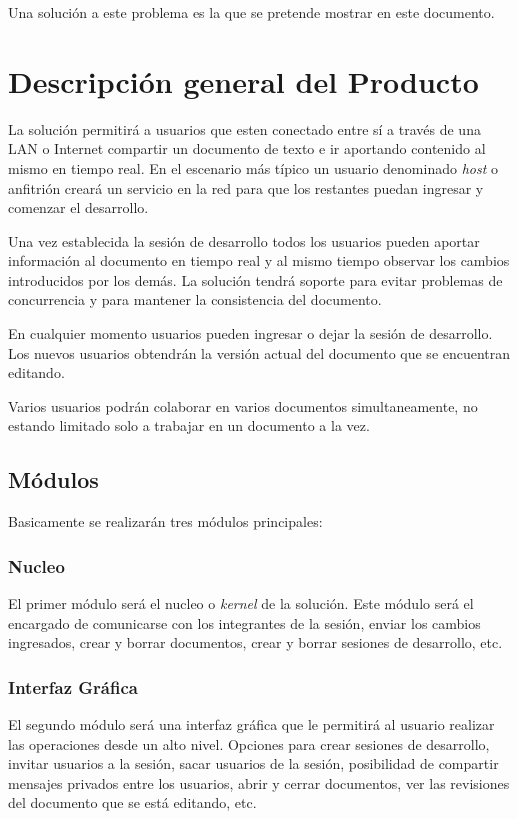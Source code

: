 \documentclass[a4paper,11pt]{article}
\begin{document}
		    Una soluci\'on a este problema es la que se pretende mostrar en este documento.

	\section{Descripci\'on general del Producto}
		La soluci\'on permitir\'a a usuarios que esten conectado entre s\'i a trav\'es de
		una LAN o Internet compartir un documento de texto e ir aportando contenido al mismo en
		tiempo real. En el escenario m\'as t\'ipico un usuario denominado \textit{host} o
		anfitri\'on crear\'a un servicio en la red para que los restantes puedan ingresar y
		comenzar el desarrollo.

		Una vez establecida la sesi\'on de desarrollo todos los usuarios pueden aportar
		informaci\'on al documento en tiempo real y al mismo tiempo observar los cambios
		introducidos por los dem\'as. La soluci\'on tendr\'a soporte para evitar problemas de
		concurrencia y para mantener la consistencia del documento.

	    En cualquier momento usuarios pueden ingresar o dejar la sesi\'on de desarrollo. Los
	    nuevos usuarios obtendr\'an la versi\'on actual del documento que se encuentran editando.

	    Varios usuarios podr\'an colaborar en varios documentos simultaneamente, no estando
	    limitado solo a trabajar en un documento a la vez.

		\subsection{M\'odulos}
			Basicamente se realizar\'an tres m\'odulos principales:

				\subsubsection{Nucleo}
					El primer m\'odulo ser\'a el nucleo o \textit{kernel} de la soluci\'on.
					Este m\'odulo ser\'a el encargado de comunicarse con los integrantes de
					la sesi\'on, enviar los cambios ingresados, crear y borrar documentos,
					crear y borrar sesiones de desarrollo, etc.

				\subsubsection{Interfaz Gr\'afica}
					El segundo m\'odulo ser\'a una interfaz gr\'afica que le permitir\'a al
					usuario realizar las operaciones desde un alto nivel. Opciones para crear
					sesiones de desarrollo, invitar usuarios a la sesi\'on, sacar usuarios de
					la sesi\'on, posibilidad de compartir mensajes privados entre los usuarios,
					abrir y cerrar documentos, ver las revisiones del documento que se est\'a
					editando, etc.
\end{document}

